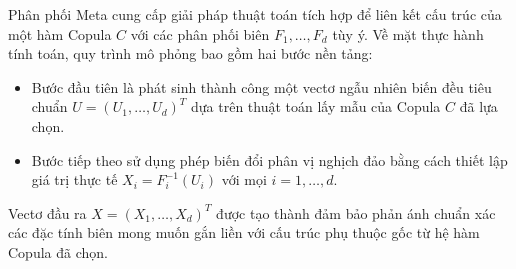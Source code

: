 Phân phối Meta cung cấp giải pháp thuật toán tích hợp để liên kết cấu trúc của một hàm Copula $C$ với các phân phối biên $F_1, \dots, F_d$ tùy ý. Về mặt thực hành tính toán, quy trình mô phỏng bao gồm hai bước nền tảng:
\begin{itemize}
    \item Bước đầu tiên là phát sinh thành công một vectơ ngẫu nhiên biến đều tiêu chuẩn $U = (U_1, \dots, U_d)^T$ dựa trên thuật toán lấy mẫu của Copula $C$ đã lựa chọn.
    \item Bước tiếp theo sử dụng phép biến đổi phân vị nghịch đảo bằng cách thiết lập giá trị thực tế $X_i = F_i^{-1}(U_i)$ với mọi $i = 1, \dots, d$.
\end{itemize}
Vectơ đầu ra $X = (X_1, \dots, X_d)^T$ được tạo thành đảm bảo phản ánh chuẩn xác các đặc tính biên mong muốn gắn liền với cấu trúc phụ thuộc gốc từ hệ hàm Copula đã chọn.